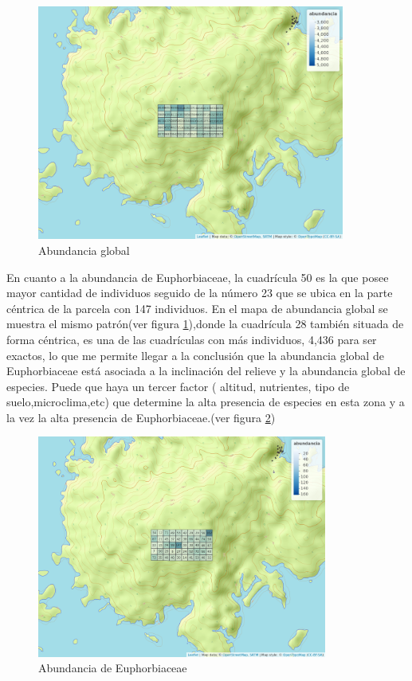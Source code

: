 \documentclass[11pt,]{article}
\begin{document}
\begin{figure}
\centering
\includegraphics[width=0.90000\textwidth]{mapa_cuadros_abun_global.png}
\caption{\label{fig:cuadro_de_abundancia_global}Abundancia global}
\end{figure}

En cuanto a la abundancia de Euphorbiaceae, la cuadrícula 50 es la que
posee mayor cantidad de individuos seguido de la número 23 que se ubica
en la parte céntrica de la parcela con 147 individuos. En el mapa de
abundancia global se muestra el mismo patrón(ver figura
\ref{fig:cuadro_de_abundancia_global}),donde la cuadrícula 28 también
situada de forma céntrica, es una de las cuadrículas con más individuos,
4,436 para ser exactos, lo que me permite llegar a la conclusión que la
abundancia global de Euphorbiaceae está asociada a la inclinación del
relieve y la abundancia global de especies. Puede que haya un tercer
factor ( altitud, nutrientes, tipo de suelo,microclima,etc) que
determine la alta presencia de especies en esta zona y a la vez la alta
presencia de Euphorbiaceae.(ver figura
\ref{fig:cuadro_abundancia_de_mi_familia})

\begin{figure}
\centering
\includegraphics[width=0.85000\textwidth]{mapa_cuadros_abun_mi_familia.png}
\caption{\label{fig:cuadro_abundancia_de_mi_familia}Abundancia de
Euphorbiaceae}
\end{figure}
\end{document}
